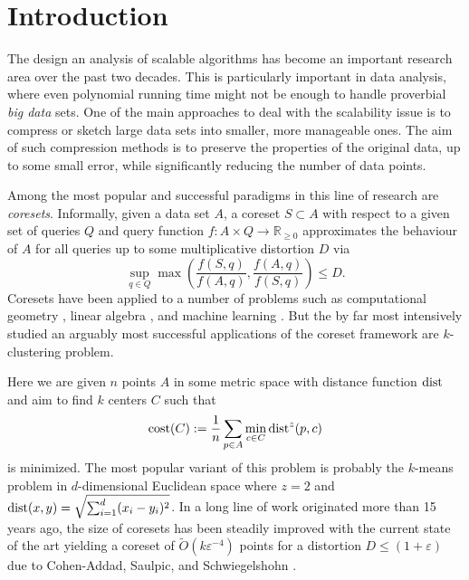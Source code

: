 \section{Introduction}

The design an analysis of scalable algorithms has become an important research area over the past two decades. This is particularly important in data analysis, where even polynomial running time might not be enough to handle proverbial \emph{big data} sets.
One of the main approaches to deal with the scalability issue is to compress or sketch large data sets into smaller, more manageable ones. The aim of such compression methods is to preserve the properties of the original data, up to some small error, while significantly reducing the number of data points.

Among the most popular and successful paradigms in this line of research are \emph{coresets}. Informally, given a data set $A$, a coreset $S\subset A$ with respect to a given set of queries $Q$ and query function $f: A\times Q \rightarrow \mathbb{R}_{\geq 0}$ approximates the behaviour of $A$ for all queries up to some multiplicative distortion $D$ via
$$ \sup_{q\in Q} \max\left( \frac{f(S,q)}{f(A,q)},\frac{f(A,q)}{f(S,q)}\right) \leq D.$$
Coresets have been applied to a number of problems such as computational geometry \cite{AHV05,Chan09}, linear algebra \cite{IndykMGR20,maalouf2019fast}, and machine learning \cite{MRM21,MunteanuSSW18}. But the by far most intensively studied an arguably most successful applications of the coreset framework are $k$-clustering problem.

Here we are given $n$ points $A$ in some metric space with distance function $\text{dist}$ and aim to find $k$ centers $C$ such that 
$$\text{cost}(C):= \frac{1}{n} \sum_{p\in A}  \min_{c\in C} \text{dist}^z(p,c)$$
is minimized. The most popular variant of this problem is probably the $k$-means problem in $d$-dimensional Euclidean space where $z=2$ and $\text{dist}(x,y) = \sqrt{\sum_{i=1}^d (x_i-y_i)^2}$.
In a long line of work originated more than 15 years ago\cite{BecchettiBC0S19,BravermanJKW21,Chen09,FL11,FeldmanSS20,
HaM04,HaK07,huang2020coresets,BravermanJKW21,LS10,SohlerW18}, the size of coresets has been steadily improved with the current state of the art yielding a coreset of $\tilde{O}(k\varepsilon^{-4})$ points for a distortion $D\leq (1+\varepsilon)$ due to Cohen-Addad, Saulpic, and Schwiegelshohn \cite{Cohen-AddadSS21}.


